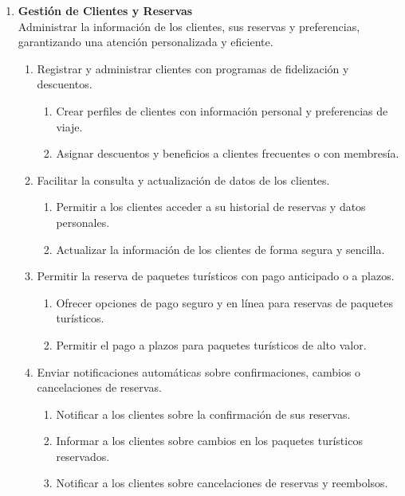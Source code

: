 \begin{enumerate}[label=\textcolor{red}{RF-\arabic*.}]
    \item \textbf{Gestión de Clientes y Reservas}\\
    Administrar la información de los clientes, sus reservas y preferencias, garantizando una atención personalizada y eficiente.
    \begin{enumerate}[label=\textcolor{red}{RF-2.\arabic*}]
        \item Registrar y administrar clientes con programas de fidelización y descuentos.\\
        \begin{enumerate}[label=\textcolor{red}{RF-2.1.\arabic*}]
            \item Crear perfiles de clientes con información personal y preferencias de viaje.
            \item Asignar descuentos y beneficios a clientes frecuentes o con membresía.
        \end{enumerate}
        \item Facilitar la consulta y actualización de datos de los clientes.
        \begin{enumerate}[label=\textcolor{red}{RF-2.2.\arabic*}]
            \item Permitir a los clientes acceder a su historial de reservas y datos personales.
            \item Actualizar la información de los clientes de forma segura y sencilla.
        \end{enumerate}
        \item Permitir la reserva de paquetes turísticos con pago anticipado o a plazos.
        \begin{enumerate}[label=\textcolor{red}{RF-2.3.\arabic*}]
            \item Ofrecer opciones de pago seguro y en línea para reservas de paquetes turísticos.
            \item Permitir el pago a plazos para paquetes turísticos de alto valor.
        \end{enumerate}
        \item Enviar notificaciones automáticas sobre confirmaciones, cambios o cancelaciones de reservas.
        \begin{enumerate}[label=\textcolor{red}{RF-2.4.\arabic*}]
            \item Notificar a los clientes sobre la confirmación de sus reservas.
            \item Informar a los clientes sobre cambios en los paquetes turísticos reservados.
            \item Notificar a los clientes sobre cancelaciones de reservas y reembolsos.
        \end{enumerate}
    \end{enumerate}


\end{enumerate}
